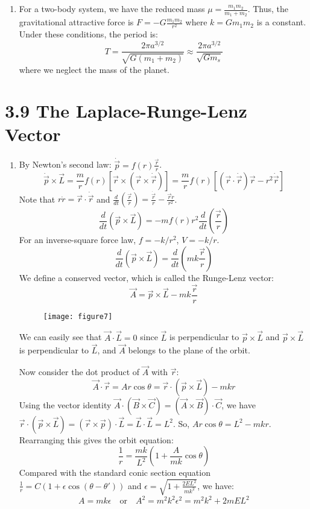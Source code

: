 \documentclass{article}
\begin{document}
\begin{enumerate}
		\item For a two-body system, we have the reduced mass $\mu = \frac{m_1 m_2}{m_1+m_2}$. Thus, the gravitational attractive force is $F = -G\frac{m_1 m_2}{r^2}$ where $k = G m_1 m_2$ is a constant. Under these conditions, the period is:
		\[
		T = \frac{2\pi a^{3/2}}{\sqrt{G(m_1+m_2)}} \approx \frac{2\pi a^{3/2}}{\sqrt{Gm_s}}
		\]
		where we neglect the mass of the planet.
	\end{enumerate}
	
	\section*{3.9 The Laplace-Runge-Lenz Vector}
	\begin{enumerate}
		\item By Newton's second law: $\dot{\vec{p}} = f(r) \frac{\vec{r}}{r}$.
		\[
		\dot{\vec{p}} \times \vec{L} = \frac{m}{r} f(r) [\vec{r} \times (\vec{r} \times \dot{\vec{r}})] = \frac{m}{r} f(r) [(\vec{r} \cdot \dot{\vec{r}})\vec{r} - r^2 \dot{\vec{r}}]
		\]
		Note that $r\dot{r} = \vec{r} \cdot \dot{\vec{r}}$ and $\frac{d}{dt}\left(\frac{\vec{r}}{r}\right) = \frac{\dot{\vec{r}}}{r} - \frac{\vec{r}\dot{r}}{r^2}$.
		\[
		\frac{d}{dt}(\vec{p} \times \vec{L}) = -m f(r) r^2 \frac{d}{dt}\left(\frac{\vec{r}}{r}\right)
		\]
		For an inverse-square force law, $f = -k/r^2$, $V=-k/r$.
		\[
		\frac{d}{dt}(\vec{p} \times \vec{L}) = \frac{d}{dt}\left(mk\frac{\vec{r}}{r}\right)
		\]
		We define a conserved vector, which is called the Runge-Lenz vector:
		\[
		\vec{A} = \vec{p} \times \vec{L} - mk\frac{\vec{r}}{r}
		\]
		
		\begin{figure}[h]
			\centering
			\texttt{[image: figure7]}
			\caption{}
			\label{fig:figure7}
		\end{figure}
		
		We can easily see that $\vec{A} \cdot \vec{L} = 0$ since $\vec{L}$ is perpendicular to $\vec{p} \times \vec{L}$ and $\vec{p} \times \vec{L}$ is perpendicular to $\vec{L}$, and $\vec{A}$ belongs to the plane of the orbit.
		
		Now consider the dot product of $\vec{A}$ with $\vec{r}$:
		\[
		\vec{A} \cdot \vec{r} = Ar\cos\theta = \vec{r} \cdot (\vec{p} \times \vec{L}) - mkr
		\]
		Using the vector identity $\vec{A} \cdot (\vec{B} \times \vec{C}) = (\vec{A} \times \vec{B}) \cdot \vec{C}$, we have $\vec{r} \cdot (\vec{p} \times \vec{L}) = (\vec{r} \times \vec{p}) \cdot \vec{L} = \vec{L} \cdot \vec{L} = L^2$.
		So, $Ar\cos\theta = L^2 - mkr$. Rearranging this gives the orbit equation:
		\[
		\frac{1}{r} = \frac{mk}{L^2}\left(1 + \frac{A}{mk}\cos\theta\right)
		\]
		Compared with the standard conic section equation $\frac{1}{r} = C(1+\epsilon\cos(\theta-\theta'))$ and $\epsilon = \sqrt{1+\frac{2EL^2}{mk^2}}$, we have:
		\[
		A = mk\epsilon \quad \text{or} \quad A^2 = m^2k^2\epsilon^2 = m^2k^2 + 2mEL^2
		\]
	\end{enumerate}
	
\end{document}
